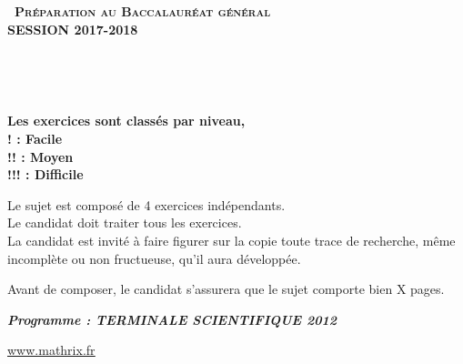 \documentclass[11pt]{article}
\begin{document}
\setlength\parindent{0mm}

		\renewcommand \footrulewidth{.2pt}
		\pagestyle{fancy}
		\thispagestyle{empty} 

		\begin{center} 
		{\Large{\textbf{\textsc{\decofourleft~Préparation au Baccalauréat général ~\decofourright\\[5pt]
		\vspace{0.3cm}
		SESSION 2017-2018}}}}


		\vspace{1cm}

		\\

		\vspace{1.2cm}

		\\
		\vspace{0.4cm}

		\vspace{0.4cm}
		\textbf{Les exercices sont classés par niveau, \\ 
		! : Facile\\
		!! : Moyen\\
		!!! : Difficile }
		\vspace{1.5cm}

		Le sujet est composé de 4 exercices indépendants.\\
		Le candidat doit traiter tous les exercices.\\
		La candidat est invité à faire figurer sur la copie toute trace de recherche, même incomplète ou 			non fructueuse, qu'il aura développée.

		\vspace{1.5cm}

		Avant de composer, le candidat s'assurera que le sujet comporte bien X pages.

		\vspace{1cm}

		\textbf{\textit{Programme : TERMINALE SCIENTIFIQUE 2012}}
	
		\vspace{2cm}
		\href{http://www.mathrix.fr}{\Large\underline{www.mathrix.fr}}


\newpage
	\end{center}
\end{document}
